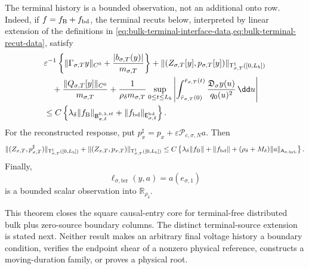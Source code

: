 \begin{theorem}
The terminal history is a bounded observation, not an additional onto row.
Indeed, if \(f=f_{\rm B}+f_{\rm bd}\), the terminal recuts below,
interpreted by linear extension of the definitions in
\cref{eq:bulk-terminal-interface-data,eq:bulk-terminal-recut-data}, satisfy
\begin{align}
 &\varepsilon^{-1}\left\{
   \|\Gamma_{\sigma,T}y\|_{C^0}
      +\frac{|b_{\sigma,T}(y)|}{m_{\sigma,T}}\right\}
 +\|(Z_{\sigma,T}[y],p_{\sigma,T}[y])\|_
       {\mathsf T_{\sigma,T}^1([0,L_b])}\notag\\
 &\quad
 +\frac{\|Q_{\sigma,T}[y]\|_{C^0}}{m_{\sigma,T}}
 +\frac1{\rho_\delta m_{\sigma,T}}
   \sup_{0\le t\le L_b}
   \left|\int_{\bar r_{\sigma,T}(0)}^{\bar r_{\sigma,T}(t)}
       \frac{\mathfrak D_\sigma y(u)}{q_0(u)^2}\,\dd u\right|\notag\\
 &\le C\left\{
     \lambda_\delta\|f_{\rm B}\|_
       {\mathsf B_{\sigma,\delta}^{0,\lambda,\mathrm{tf}}}
       +\|f_{\rm bd}\|_{\mathsf E_{\sigma,\delta}^{\mathrm{bd}}}
       \right\}.                                 \label{eq:source-split-terminal-observation}
\end{align}
For the reconstructed response, put
\(
 p_x^\sharp=p_x+\varepsilon\mathscr P_{c,\sigma,N}a
\).
Then
\begin{equation}
 \|(Z_{x,T},p_{x,T}^\sharp)\|_
       {\mathsf T_{\sigma,T}^1([0,L_b])}
 +\|(Z_{x,T},p_{x,T})\|_
       {\mathsf T_{\sigma,T}^1([0,L_b])}
 \le C\left\{
   \lambda_\delta\|f_{\rm B}\|
   +\|f_{\rm bd}\|
   +(\rho_\delta+M_\delta)
        \|a\|_{\mathsf A_{\sigma,\mathrm{hyb}}}\right\}.     \label{eq:source-split-reconstructed-terminal-observation}
\end{equation}
Finally,
\begin{equation}
 \ell_{\sigma,\mathrm{ter}}(y,a)=a(e_{\sigma,1})             \label{eq:source-split-terminal-event-row}
\end{equation}
is a bounded scalar observation into \(\mathbb R_{\rho_\delta}\).

This theorem closes the square causal-entry core for terminal-free
distributed bulk plus zero-source boundary columns.  The distinct
terminal-source extension is stated next.  Neither result makes an arbitrary
final voltage history a boundary condition, verifies the endpoint shear of a
nonzero physical reference, constructs a moving-duration family, or proves a
physical root.
\end{theorem}

